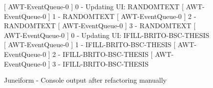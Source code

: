 \begin{figure}[p]
\begin{sourcecode}
\begin{textcode}{}
[ AWT-EventQueue-0 ] 0 - Updating UI: RANDOMTEXT
[ AWT-EventQueue-0 ] 1 - RANDOMTEXT
[ AWT-EventQueue-0 ] 2 - RANDOMTEXT
[ AWT-EventQueue-0 ] 3 - RANDOMTEXT
[ AWT-EventQueue-0 ] 0 - Updating UI: IFILL-BRITO-BSC-THESIS
[ AWT-EventQueue-0 ] 1 - IFILL-BRITO-BSC-THESIS
[ AWT-EventQueue-0 ] 2 - IFILL-BRITO-BSC-THESIS
[ AWT-EventQueue-0 ] 3 - IFILL-BRITO-BSC-THESIS
\end{textcode}
\caption{Juneiform - Console output after refactoring manually}
\label{code:example-console}
\end{sourcecode}
\end{figure}
